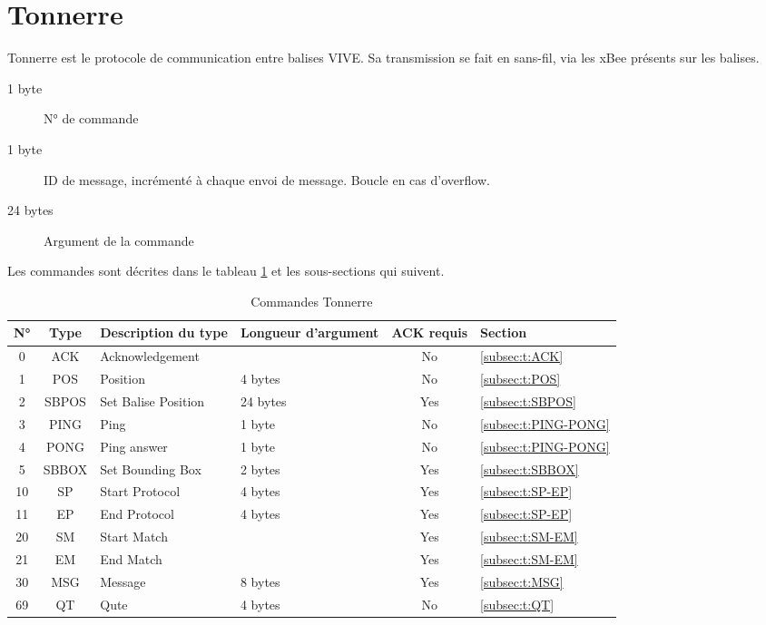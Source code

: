 ﻿\section{Tonnerre}

Tonnerre est le protocole de communication entre balises VIVE.
Sa transmission se fait en sans-fil, via les xBee présents sur les balises.

\begin{description}
	\item[1 byte] N° de commande
	\item[1 byte] ID de message, incrémenté à chaque envoi de message. Boucle en cas d'overflow.
	\item[24 bytes] Argument de la commande
\end{description}

Les commandes sont décrites dans le tableau \ref{fig:commandes-tonnerre} et les sous-sections qui suivent.

\begin{table}[htb]
	\centering
	\begin{tabular}{|c|c|l|l|c|l|}
		\hline
		N° & Type  & Description du type & Longueur d'argument & ACK requis & Section \\
		\hline
		0  & ACK   & Acknowledgement     &          & No & \ref{subsec:t:ACK} \\
		\hline
		1  & POS   & Position            & 4 bytes  & No & \ref{subsec:t:POS} \\
		2  & SBPOS & Set Balise Position & 24 bytes & Yes & \ref{subsec:t:SBPOS} \\
		\hline
		3  & PING  & Ping                & 1 byte   & No & \ref{subsec:t:PING-PONG} \\
		4  & PONG  & Ping answer         & 1 byte   & No & \ref{subsec:t:PING-PONG} \\
		\hline
		5  & SBBOX & Set Bounding Box    & 2 bytes  & Yes & \ref{subsec:t:SBBOX} \\
		\hline
		10 & SP    & Start Protocol      & 4 bytes  & Yes & \ref{subsec:t:SP-EP} \\
		11 & EP    & End Protocol        & 4 bytes  & Yes & \ref{subsec:t:SP-EP} \\
		\hline
		20 & SM    & Start Match         &          & Yes & \ref{subsec:t:SM-EM} \\
		21 & EM    & End Match           &          & Yes & \ref{subsec:t:SM-EM} \\
		\hline
		30 & MSG   & Message             & 8 bytes  & Yes & \ref{subsec:t:MSG} \\
		\hline
		69 & QT    & Qute                & 4 bytes  & No & \ref{subsec:t:QT} \\
		\hline
	\end{tabular}
	\caption{Commandes Tonnerre}
	\label{fig:commandes-tonnerre}
\end{table}

